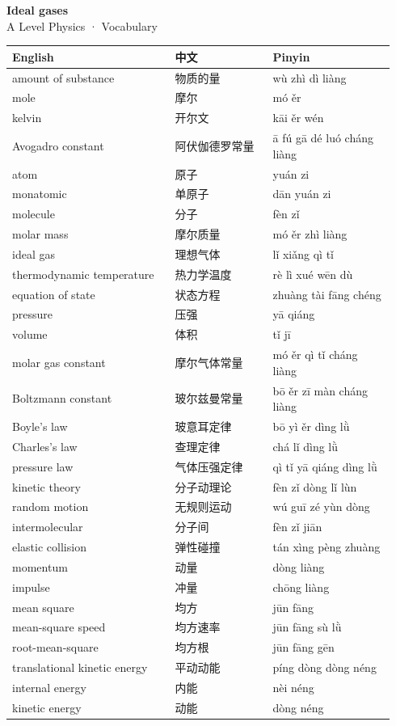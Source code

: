 \documentclass[11pt]{article}
\begin{document}
\begin{center}
  {\LARGE\bfseries Ideal gases}\\[0.35em]
  {\large A Level Physics · Vocabulary}
\end{center}
\vspace{0.6em}

\begin{longtable}{@{}p{0.40\linewidth}p{0.24\linewidth}p{0.30\linewidth}@{}}
\toprule
\textbf{English} & \textbf{中文} & \textbf{Pinyin} \\
\midrule
\endhead
\bottomrule
\endlastfoot
amount of substance & 物质的量 & wù zhì dì liàng \\
mole & 摩尔 & mó ěr \\
kelvin & 开尔文 & kāi ěr wén \\
Avogadro constant & 阿伏伽德罗常量 & ā fú gā dé luó cháng liàng \\
atom & 原子 & yuán zi \\
monatomic & 单原子 & dān yuán zi \\
molecule & 分子 & fèn zǐ \\
molar mass & 摩尔质量 & mó ěr zhì liàng \\
ideal gas & 理想气体 & lǐ xiǎng qì tǐ \\
thermodynamic temperature & 热力学温度 & rè lì xué wēn dù \\
equation of state & 状态方程 & zhuàng tài fāng chéng \\
pressure & 压强 & yā qiáng \\
volume & 体积 & tǐ jī \\
molar gas constant & 摩尔气体常量 & mó ěr qì tǐ cháng liàng \\
Boltzmann constant & 玻尔兹曼常量 & bō ěr zī màn cháng liàng \\
Boyle's law & 玻意耳定律 & bō yì ěr dìng lǜ \\
Charles's law & 查理定律 & chá lǐ dìng lǜ \\
pressure law & 气体压强定律 & qì tǐ yā qiáng dìng lǜ \\
kinetic theory & 分子动理论 & fèn zǐ dòng lǐ lùn \\
random motion & 无规则运动 & wú guī zé yùn dòng \\
intermolecular & 分子间 & fèn zǐ jiān \\
elastic collision & 弹性碰撞 & tán xìng pèng zhuàng \\
momentum & 动量 & dòng liàng \\
impulse & 冲量 & chōng liàng \\
mean square & 均方 & jūn fāng \\
mean-square speed & 均方速率 & jūn fāng sù lǜ \\
root-mean-square & 均方根 & jūn fāng gēn \\
translational kinetic energy & 平动动能 & píng dòng dòng néng \\
internal energy & 内能 & nèi néng \\
kinetic energy & 动能 & dòng néng \\
\end{longtable}
\end{document}
